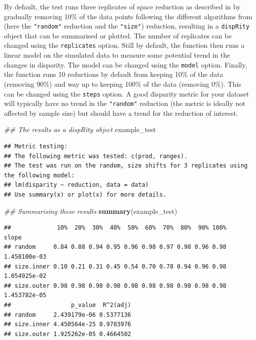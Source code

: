 \documentclass[
]{book}
\newenvironment{Shaded}{\begin{snugshade}}{\end{snugshade}}
\newcommand{\CommentTok}[1]{\textcolor[rgb]{0.56,0.35,0.01}{\textit{#1}}}
\newcommand{\KeywordTok}[1]{\textcolor[rgb]{0.13,0.29,0.53}{\textbf{#1}}}
\newcommand{\NormalTok}[1]{#1}
\begin{document}
By default, the test runs three replicates of space reduction as described in \citet{moms} by gradually removing 10\% of the data points following the different algorithms from \citet{moms} (here the \texttt{"random"} reduction and the \texttt{"size"}) reduction, resulting in a \texttt{dispRity} object that can be summarised or plotted.
The number of replicates can be changed using the \texttt{replicates} option.
Still by default, the function then runs a linear model on the simulated data to measure some potential trend in the changes in disparity.
The model can be changed using the \texttt{model} option.
Finally, the function runs 10 reductions by default from keeping 10\% of the data (removing 90\%) and way up to keeping 100\% of the data (removing 0\%).
This can be changed using the \texttt{steps} option.
A good disparity metric for your dataset will typically have no trend in the \texttt{"random"} reduction (the metric is ideally not affected by sample size) but should have a trend for the reduction of interest.

\begin{Shaded}
\begin{Highlighting}[]
\CommentTok{\#\# The results as a dispRity object}
\NormalTok{example\_test}
\end{Highlighting}
\end{Shaded}

\begin{verbatim}
## Metric testing:
## The following metric was tested: c(prod, ranges).
## The test was run on the random, size shifts for 3 replicates using the following model:
## lm(disparity ~ reduction, data = data)
## Use summary(x) or plot(x) for more details.
\end{verbatim}

\begin{Shaded}
\begin{Highlighting}[]
\CommentTok{\#\# Summarising these results}
\KeywordTok{summary}\NormalTok{(example\_test)}
\end{Highlighting}
\end{Shaded}

\begin{verbatim}
##             10%  20%  30%  40%  50%  60%  70%  80%  90% 100%        slope
## random     0.84 0.88 0.94 0.95 0.96 0.98 0.97 0.98 0.96 0.98 1.450100e-03
## size.inner 0.10 0.21 0.31 0.45 0.54 0.70 0.78 0.94 0.96 0.98 1.054925e-02
## size.outer 0.98 0.98 0.98 0.98 0.98 0.98 0.98 0.98 0.98 0.98 1.453782e-05
##                 p_value  R^2(adj)
## random     2.439179e-06 0.5377136
## size.inner 4.450564e-25 0.9783976
## size.outer 1.925262e-05 0.4664502
\end{verbatim}
\end{document}

